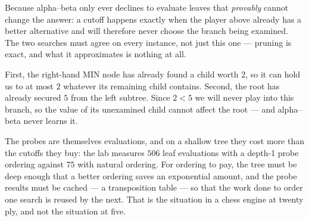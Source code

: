 \begin{ans}
  \item Because alpha--beta only ever declines to evaluate leaves that
        \emph{provably} cannot change the answer: a cutoff happens exactly when the
        player above already has a better alternative and will therefore never
        choose the branch being examined. The two searches must agree on every
        instance, not just this one --- pruning is exact, and what it approximates
        is nothing at all.
  \item First, the right-hand MIN node has already found a child worth $2$, so it
        can hold us to at most $2$ whatever its remaining child contains. Second,
        the root has already secured $5$ from the left subtree. Since $2 < 5$ we
        will never play into this branch, so the value of its unexamined child
        cannot affect the root --- and alpha--beta never learns it.
  \item The probes are themselves evaluations, and on a shallow tree they cost more
        than the cutoffs they buy: the lab measures $506$ leaf evaluations with a
        depth-1 probe ordering against $75$ with natural ordering. For ordering to
        pay, the tree must be deep enough that a better ordering saves an
        exponential amount, and the probe results must be cached --- a
        transposition table --- so that the work done to order one search is reused
        by the next. That is the situation in a chess engine at twenty ply, and not
        the situation at five.
\end{ans}

